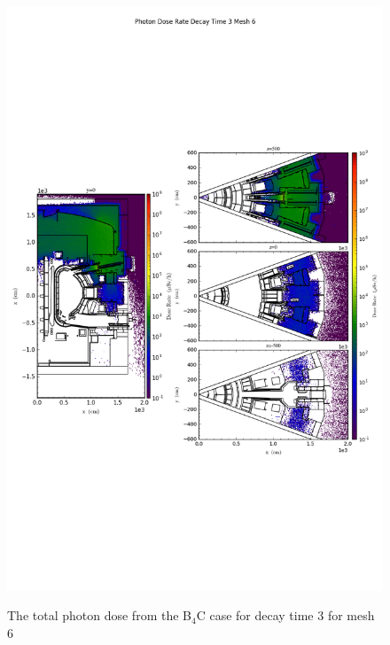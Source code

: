 \begin{figure}[ht!]
\centering
\includegraphics[trim={0cm 9cm 0cm 10cm},clip,scale=0.75]{../plots/final_model_with_b4c/Photon_Dose_Rate_Decay_Time_3_Mesh_6.png}
\label{fig:photons_dc3_no4bc_m6_flux}
\caption{The total photon dose from the B$_4$C case for decay time 3 for mesh 6}
\end{figure}
